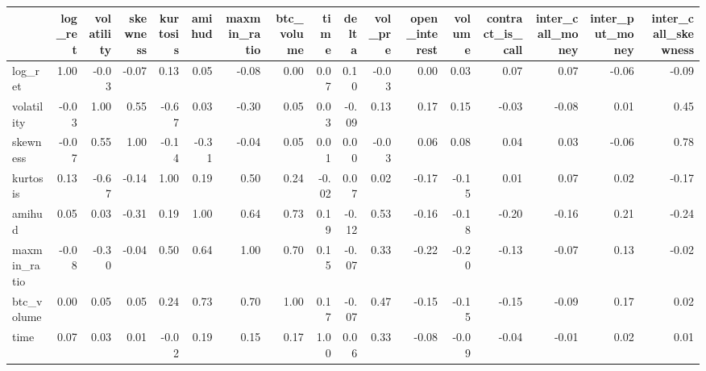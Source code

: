 \begin{tabular}{lrrrrrrrrrrrrrrrr}
\toprule
{} &  log\_ret &  volatility &  skewness &  kurtosis &  amihud &  maxmin\_ratio &  btc\_volume &  time &  delta &  vol\_pre &  open\_interest &  volume &  contract\_is\_call &  inter\_call\_money &  inter\_put\_money &  inter\_call\_skewness \\
\midrule
log\_ret             &     1.00 &       -0.03 &     -0.07 &      0.13 &    0.05 &         -0.08 &        0.00 &  0.07 &   0.10 &    -0.03 &           0.00 &    0.03 &              0.07 &              0.07 &            -0.06 &                -0.09 \\
volatility          &    -0.03 &        1.00 &      0.55 &     -0.67 &    0.03 &         -0.30 &        0.05 &  0.03 &  -0.09 &     0.13 &           0.17 &    0.15 &             -0.03 &             -0.08 &             0.01 &                 0.45 \\
skewness            &    -0.07 &        0.55 &      1.00 &     -0.14 &   -0.31 &         -0.04 &        0.05 &  0.01 &   0.00 &    -0.03 &           0.06 &    0.08 &              0.04 &              0.03 &            -0.06 &                 0.78 \\
kurtosis            &     0.13 &       -0.67 &     -0.14 &      1.00 &    0.19 &          0.50 &        0.24 & -0.02 &   0.07 &     0.02 &          -0.17 &   -0.15 &              0.01 &              0.07 &             0.02 &                -0.17 \\
amihud              &     0.05 &        0.03 &     -0.31 &      0.19 &    1.00 &          0.64 &        0.73 &  0.19 &  -0.12 &     0.53 &          -0.16 &   -0.18 &             -0.20 &             -0.16 &             0.21 &                -0.24 \\
maxmin\_ratio        &    -0.08 &       -0.30 &     -0.04 &      0.50 &    0.64 &          1.00 &        0.70 &  0.15 &  -0.07 &     0.33 &          -0.22 &   -0.20 &             -0.13 &             -0.07 &             0.13 &                -0.02 \\
btc\_volume          &     0.00 &        0.05 &      0.05 &      0.24 &    0.73 &          0.70 &        1.00 &  0.17 &  -0.07 &     0.47 &          -0.15 &   -0.15 &             -0.15 &             -0.09 &             0.17 &                 0.02 \\
time                &     0.07 &        0.03 &      0.01 &     -0.02 &    0.19 &          0.15 &        0.17 &  1.00 &   0.06 &     0.33 &          -0.08 &   -0.09 &             -0.04 &             -0.01 &             0.02 &                 0.01 \\

\end{tabular}
